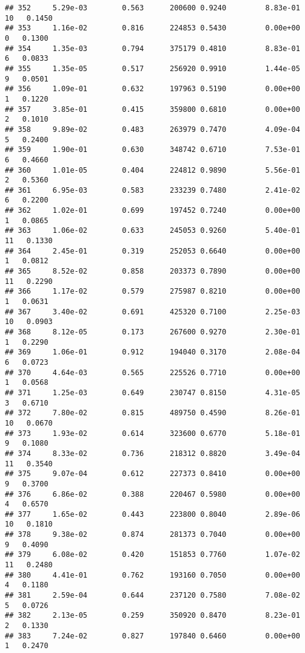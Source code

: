 \documentclass[
]{article}
\begin{document}
\begin{verbatim}
## 352     5.29e-03        0.563      200600 0.9240         8.83e-01  10   0.1450
## 353     1.16e-02        0.816      224853 0.5430         0.00e+00   0   0.1300
## 354     1.35e-03        0.794      375179 0.4810         8.83e-01   6   0.0833
## 355     1.35e-05        0.517      256920 0.9910         1.44e-05   9   0.0501
## 356     1.09e-01        0.632      197963 0.5190         0.00e+00   1   0.1220
## 357     3.85e-01        0.415      359800 0.6810         0.00e+00   2   0.1010
## 358     9.89e-02        0.483      263979 0.7470         4.09e-04   5   0.2400
## 359     1.90e-01        0.630      348742 0.6710         7.53e-01   6   0.4660
## 360     1.01e-05        0.404      224812 0.9890         5.56e-01   2   0.5360
## 361     6.95e-03        0.583      233239 0.7480         2.41e-02   6   0.2200
## 362     1.02e-01        0.699      197452 0.7240         0.00e+00   1   0.0865
## 363     1.06e-02        0.633      245053 0.9260         5.40e-01  11   0.1330
## 364     2.45e-01        0.319      252053 0.6640         0.00e+00   1   0.0812
## 365     8.52e-02        0.858      203373 0.7890         0.00e+00  11   0.2290
## 366     1.17e-02        0.579      275987 0.8210         0.00e+00   1   0.0631
## 367     3.40e-02        0.691      425320 0.7100         2.25e-03  10   0.0903
## 368     8.12e-05        0.173      267600 0.9270         2.30e-01   1   0.2290
## 369     1.06e-01        0.912      194040 0.3170         2.08e-04   6   0.0723
## 370     4.64e-03        0.565      225526 0.7710         0.00e+00   1   0.0568
## 371     1.25e-03        0.649      230747 0.8150         4.31e-05   3   0.6710
## 372     7.80e-02        0.815      489750 0.4590         8.26e-01  10   0.0670
## 373     1.93e-02        0.614      323600 0.6770         5.18e-01   9   0.1080
## 374     8.33e-02        0.736      218312 0.8820         3.49e-04  11   0.3540
## 375     9.07e-04        0.612      227373 0.8410         0.00e+00   9   0.3700
## 376     6.86e-02        0.388      220467 0.5980         0.00e+00   4   0.6570
## 377     1.65e-02        0.443      223800 0.8040         2.89e-06  10   0.1810
## 378     9.38e-02        0.874      281373 0.7040         0.00e+00   9   0.4090
## 379     6.08e-02        0.420      151853 0.7760         1.07e-02  11   0.2480
## 380     4.41e-01        0.762      193160 0.7050         0.00e+00   4   0.1180
## 381     2.59e-04        0.644      237120 0.7580         7.08e-02   5   0.0726
## 382     2.13e-05        0.259      350920 0.8470         8.23e-01   2   0.1330
## 383     7.24e-02        0.827      197840 0.6460         0.00e+00   1   0.2470

\end{verbatim}
\end{document}
